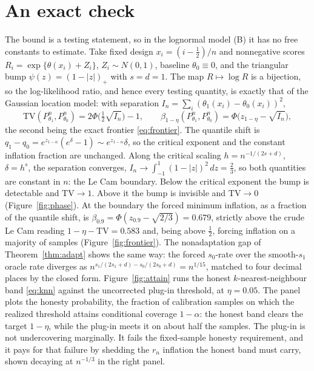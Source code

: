 \documentclass[11pt]{article}
\theoremstyle{definition}
\theoremstyle{remark}
\newcommand{\TV}{\mathrm{TV}}
\begin{document}
\section{An exact check}\label{sec:check}

The bound is a testing statement, so in the lognormal model (B) it has no free constants to
estimate. Take fixed design $x_i=(i-\tfrac12)/n$ and nonnegative scores $R_i =
\exp\{\theta(x_i)+Z_i\}$, $Z_i\sim N(0,1)$, baseline $\theta_0\equiv0$, and the triangular
bump $\psi(z)=(1-|z|)_+$ with $s=d=1$. The map $R\mapsto\log R$ is a bijection, so the
log-likelihood ratio, and hence every testing quantity, is exactly that of the Gaussian
location model: with separation $I_n=\sum_i(\theta_1(x_i)-\theta_0(x_i))^2$,
\[
  \TV(P^n_{\theta_1},P^n_{\theta_0}) = 2\Phi\!\big(\tfrac12\sqrt{I_n}\big)-1,
  \qquad
  \beta_{1-\eta}(P^n_{\theta_1},P^n_{\theta_0}) = \Phi\!\big(z_{1-\eta}-\sqrt{I_n}\big),
\]
the second being the exact frontier \eqref{eq:frontier}. The quantile shift is
$q_1-q_0=e^{z_{1-\alpha}}(e^{\delta}-1)\sim e^{z_{1-\alpha}}\delta$, so the critical exponent
and the constant inflation fraction are unchanged. Along the critical scaling
$h=n^{-1/(2s+d)}$, $\delta=h^{s}$, the separation converges,
$I_n\to\int_{-1}^{1}(1-|z|)^2\,dz=\tfrac23$, so both quantities are constant in $n$: the Le
Cam boundary. Below the critical exponent the bump is detectable and $\TV\to1$. Above it the bump is
invisible and $\TV\to0$ (Figure~\ref{fig:phase}). At the boundary the forced minimum
inflation, as a fraction of the quantile shift, is
$\beta_{0.9}=\Phi(z_{0.9}-\sqrt{2/3})=0.679$, strictly above the crude Le Cam reading
$1-\eta-\TV=0.583$ and, being above $\tfrac12$, forcing inflation on a majority of samples
(Figure~\ref{fig:frontier}). The nonadaptation gap of Theorem~\ref{thm:adapt} shows the
same way: the forced $s_0$-rate over the smooth-$s_1$ oracle rate diverges as
$n^{s_1/(2s_1+d)-s_0/(2s_0+d)}=n^{1/15}$, matched to four decimal places by the closed form.
Figure~\ref{fig:attain} runs the honest $k$-nearest-neighbour band \eqref{eq:knn} against
the uncorrected plug-in threshold, at $\eta=0.05$. The panel plots the honesty probability,
the fraction of calibration samples on which the realized threshold attains conditional
coverage $1-\alpha$: the honest band clears the target $1-\eta$, while the plug-in meets it
on about half the samples. The plug-in is not undercovering marginally. It fails the
fixed-sample honesty requirement, and it pays for that failure by shedding the $r_n$
inflation the honest band must carry, shown decaying at $n^{-1/3}$ in the right panel.
\end{document}
